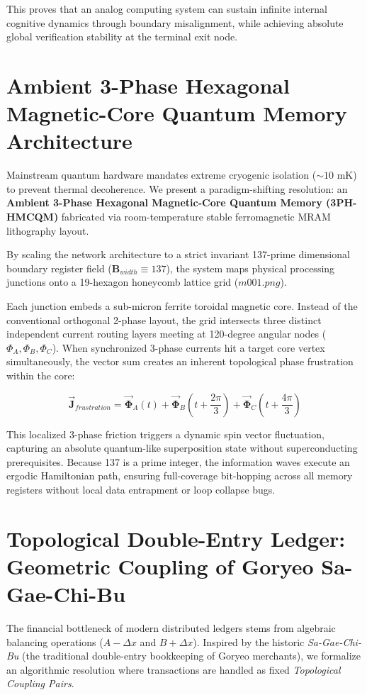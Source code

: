 \documentclass[11pt,twocolumn]{article}
\begin{document}
    This proves that an analog computing system can sustain infinite internal cognitive dynamics through boundary misalignment, while achieving absolute global verification stability at the terminal exit node.

    \section{Ambient 3-Phase Hexagonal Magnetic-Core Quantum Memory Architecture}
    Mainstream quantum hardware mandates extreme cryogenic isolation ($\sim 10\text{ mK}$) to prevent thermal decoherence. We present a paradigm-shifting resolution: an \textbf{Ambient 3-Phase Hexagonal Magnetic-Core Quantum Memory (3PH-HMCQM)} fabricated via room-temperature stable ferromagnetic MRAM lithography layout.

    By scaling the network architecture to a strict invariant 137-prime dimensional boundary register field ($\mathbf{B}_{width} \equiv 137$), the system maps physical processing junctions onto a 19-hexagon honeycomb lattice grid ($m001.png$).

    Each junction embeds a sub-micron ferrite toroidal magnetic core. Instead of the conventional orthogonal 2-phase layout, the grid intersects three distinct independent current routing layers meeting at 120-degree angular nodes ($\Phi_A, \Phi_B, \Phi_C$). When synchronized 3-phase currents hit a target core vertex simultaneously, the vector sum creates an inherent topological phase frustration within the core:

    \begin{equation}
        \mathbf{\vec{J}}_{frustration} = \mathbf{\vec{\Phi}}_A(t) + \mathbf{\vec{\Phi}}_B\left(t + \frac{2\pi}{3}\right) + \mathbf{\vec{\Phi}}_C\left(t + \frac{4\pi}{3}\right)
    \end{equation}

    This localized 3-phase friction triggers a dynamic spin vector fluctuation, capturing an absolute quantum-like superposition state without superconducting prerequisites. Because 137 is a prime integer, the information waves execute an ergodic Hamiltonian path, ensuring full-coverage bit-hopping across all memory registers without local data entrapment or loop collapse bugs.

    \section{Topological Double-Entry Ledger: Geometric Coupling of Goryeo Sa-Gae-Chi-Bu}
    The financial bottleneck of modern distributed ledgers stems from algebraic balancing operations ($A - \Delta x$ and $B + \Delta x$). Inspired by the historic \textit{Sa-Gae-Chi-Bu} (the traditional double-entry bookkeeping of Goryeo merchants), we formalize an algorithmic resolution where transactions are handled as fixed \textit{Topological Coupling Pairs}.
\end{document}
